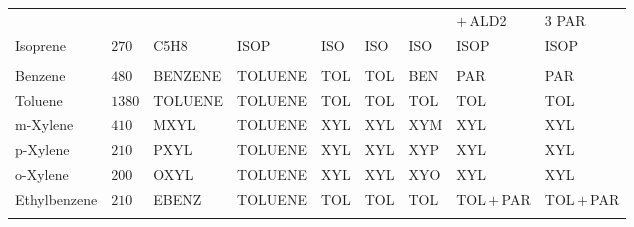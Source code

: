 \documentclass[acpd, online, hvmath]{copernicus}
\begin{document}
\begin{table}[t]
{\begin{tabular}{lllllllll}
      &&&&&&&$+$\,ALD2 &$3$ PAR \\        Isoprene &$270$ &C5H8 &ISOP &ISO
      &ISO &ISO &ISOP &ISOP \\
      \middlehline
      \multicolumn{9}{c}{{Aromatics}} \\
      \middlehline
      Benzene &$480$ &BENZENE &TOLUENE &TOL &TOL &BEN &PAR &PAR \\
      Toluene &$1380$ &TOLUENE &TOLUENE &TOL &TOL &TOL &TOL &TOL \\
      m-Xylene &$410$ &MXYL &TOLUENE &XYL &XYL &XYM &XYL &XYL \\
      p-Xylene &$210$ &PXYL &TOLUENE &XYL &XYL &XYP &XYL &XYL \\
      o-Xylene &$200$ &OXYL &TOLUENE &XYL &XYL &XYO &XYL &XYL \\
      Ethylbenzene &$210$ &EBENZ &TOLUENE &TOL &TOL &TOL
      &TOL\,$+$\,PAR &TOL\,$+$\,PAR \\
      \bottomhline
    \end{tabular}}
    \label{t:initial_conditions}
\end{table}
\end{document}
